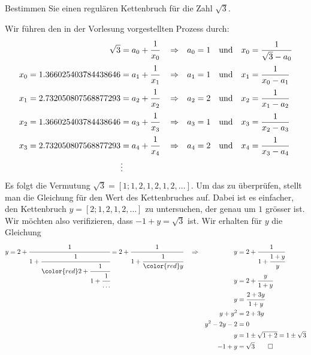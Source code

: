 Bestimmen Sie einen regulären Kettenbruch für die Zahl $\sqrt{3}$.

\begin{loesung}
Wir führen den in der Vorlesung vorgestellten Prozess durch:
\begin{align*}
\sqrt{3} &= a_0 + \cfrac{1}{x_0}
&&\Rightarrow &
a_0 &=1&&\text{und}&x_0&=\frac{1}{\sqrt{3}-a_0}
\\
x_0=1.366025403784438646&=a_1+\cfrac{1}{x_1}
&&\Rightarrow &
a_1 &=1&&\text{und}&x_1&=\frac{1}{x_0-a_1}
\\
x_1=2.732050807568877293&=a_2+\cfrac{1}{x_2}
&&\Rightarrow &
a_2 &=2&&\text{und}&x_2&=\frac{1}{x_1-a_2}
\\
x_2=1.366025403784438646&=a_3+\cfrac{1}{x_3}
&&\Rightarrow &
a_3 &=1&&\text{und}&x_3&=\frac{1}{x_2-a_3}
\\
x_3=2.732050807568877293&=a_4+\cfrac{1}{x_4}
&&\Rightarrow &
a_4 &=2&&\text{und}&x_4&=\frac{1}{x_3-a_4}
\\
&\vdots
\end{align*}
Es folgt die Vermutung $\sqrt{3} = [1;1,2,1,2,1,2,\dots]$.
Um das zu überprüfen, stellt man die Gleichung für den Wert des Kettenbruches
auf.
Dabei ist es einfacher, den Kettenbruch $y=[2;1,2,1,2,\dots]$ zu untersuchen,
der genau um $1$ grösser ist.
Wir möchten also verifizieren, dass $-1+y = \sqrt{3}$ ist.
Wir erhalten für $y$ die Gleichung 
\begin{align*}
y
&=
2 + \smash{\cfrac{1}{1+\cfrac{1}{{\color{red}2+\cfrac{1}{1+\cfrac{1}{\dots}}}}}}
=
2 + \cfrac{1}{1+\cfrac{1}{{\color{red}y}}}
&&\Rightarrow& y &=2+\cfrac{1}{1+\cfrac{1+y}{y}}
\\
&&&&
y&=2+\cfrac{y}{1+y}
\\
&&&&
y&=\cfrac{2+3y}{1+y}
\\
&&&&
y+y^2&=2+3y
\\
&&&&
y^2-2y-2&=0
\\
&&&&
y&=1\pm\sqrt{1+2}=1\pm\sqrt{3}
\\
&&&&
-1+y&=\sqrt{3}
\qedhere
\end{align*}
\end{loesung}
